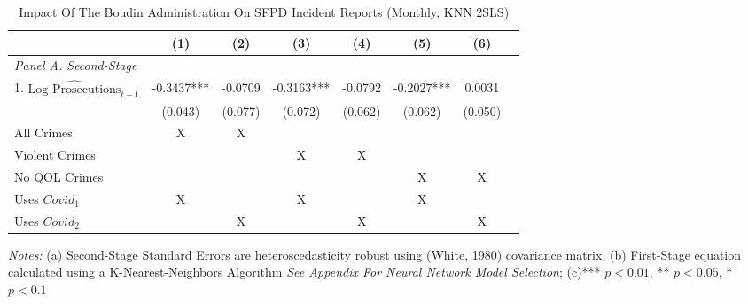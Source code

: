\begin{table}[htbp]
  \centering
  \caption{Impact Of The Boudin Administration On SFPD Incident Reports (Monthly, KNN 2SLS)}
  \label{tab:regression_incidents_knn}
  \begin{tabular}{lccccccc}
    \toprule
    & \multirow{1}{*}{(1)} & \multirow{1}{*}{(2)} & \multirow{1}{*}{(3)} & \multirow{1}{*}{(4)} & \multirow{1}{*}{(5)} & \multirow{1}{*}{(6)} \\
    \midrule
    \textit{Panel A. Second-Stage}  &   &   &  &  \\
    1. $\widehat{\text{Log Prosecutions}}_{t-1}$  & -0.3437*** & -0.0709 & -0.3163*** & -0.0792 & -0.2027*** & 0.0031 \\
     & (0.043) & (0.077) & (0.072) & (0.062) & (0.062) & (0.050) \\ \addlinespace
     All Crimes & X & X & & & & \\
     Violent Crimes & & & X & X & & \\
     No QOL Crimes & & & & & X & X \\
     Uses $Covid_1$ & X & & X & & X \\
     Uses $Covid_2$ & & X & & X & & X \\
    \bottomrule
  \end{tabular}

  \begin{flushleft}
    \textit{Notes:} (a) Second-Stage Standard Errors are heteroscedasticity robust using (White, 1980) covariance matrix; (b) First-Stage equation calculated using a K-Nearest-Neighbors Algorithm \textit{See Appendix For Neural Network Model Selection}; (c)*** $p<0.01$, ** $p<0.05$, * $p<0.1$
  \end{flushleft}
\end{table}